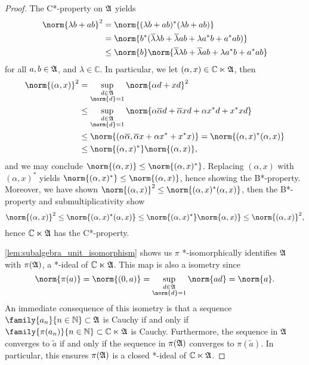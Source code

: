 \begin{proof}
    The C*-property on \(\mathfrak{A}\) yields
    \begin{align*}
        \norm{\lambda b + ab}^2 &= \norm{(\lambda b + ab)^*(\lambda b + ab)}\\
                                &= \norm{b^* (\conj{\lambda} \lambda b + \conj{\lambda}ab + \lambda a^*b + a^*a b)}\\
                                &\leq \norm{b}\norm{\conj{\lambda} \lambda b + \conj{\lambda}ab + \lambda a^*b + a^*a b}
    \end{align*}
    for all \(a,b \in \mathfrak{A}\), and \(\lambda \in \mathbb{C}\). In particular, we let \((\alpha, x) \in \mathbb{C} \ltimes \mathfrak{A}\), then
    \begin{align*}
        \norm{(\alpha, x)}^2 &= \sup_{\substack{d \in \algebra{A}\\\norm{d} = 1}}{\norm{\alpha d + xd}^2}\\
                             &\leq \sup_{\substack{d \in \algebra{A}\\\norm{d} = 1}}{\norm{\alpha \conj{\alpha} d  + \conj{\alpha}xd + \alpha x^*d + x^*x d}}\\
                             &\leq \norm{(\alpha \conj{\alpha}, \conj{\alpha}x + \alpha x^* + x^*x)} = \norm{(\alpha, x)^*(\alpha, x)}\\
                             &\leq\norm{(\alpha, x)^*}\norm{(\alpha, x)},
    \end{align*}
    and we may conclude \(\norm{(\alpha, x)} \leq \norm{(\alpha, x)^*}\). Replacing \((\alpha, x)\) with \((\alpha, x)^*\) yields \(\norm{(\alpha, x)^*} \leq \norm{(\alpha, x)}\), hence showing the B*-property. Moreover, we have shown \(\norm{(\alpha, x)}^2 \leq \norm{(\alpha, x)^*(\alpha, x)}\), then the B*-property and submultiplicativity show
    \begin{equation*}
        \norm{(\alpha, x)}^2 \leq \norm{(\alpha, x)^*(\alpha, x)} \leq \norm{(\alpha, x)^*}\norm{\alpha, x)} \leq \norm{(\alpha, x)}^2,
    \end{equation*}
    hence \(\mathbb{C} \ltimes \mathfrak{A}\) has the C*-property.

    \cref{lem:subalgebra_unit_isomorphism} shows us \(\pi\) *-isomorphically identifies \(\mathfrak{A}\) with \(\pi(\mathfrak{A})\), a *-ideal of \(\mathbb{C}\ltimes \mathfrak{A}\). This map is also a isometry since
    \begin{equation*}
        \norm{\pi(a)} = \norm{(0,a)} =\sup_{\substack{d \in \algebra{A}\\\norm{d}=1}}{\norm{ad}} = \norm{a}.
    \end{equation*}
    An immediate consequence of this isometry is that a sequence \(\family{a_n}{n\in \mathbb{N}}\subset \algebra{A}\) is Cauchy if and only if \(\family{\pi(a_n)}{n\in \mathbb{N}}\subset \mathbb{C} \ltimes \algebra{A}\) is Cauchy. Furthermore, the sequence in \(\mathfrak{A}\) converges to \(\tilde{a}\) if and only if the sequence in \(\pi(\mathfrak{A})\) converges to \(\pi(\tilde{a})\). In particular, this ensures \(\pi(\mathfrak{A})\) is a closed *-ideal of \(\mathbb{C} \ltimes \mathfrak{A}\).


\end{proof}
